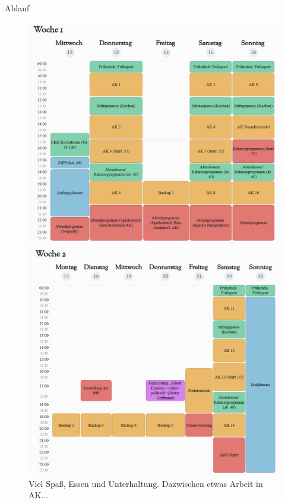 \documentclass[compress,]{beamer}
\begin{document}
\begin{frame}{Ablauf}


\begin{figure}
   \begin{minipage}[b]{.45\linewidth} %
      \includegraphics[width=\linewidth]{OstseePlan1.png}
      
   \end{minipage}
   \hspace{.05\linewidth}%
   \begin{minipage}[b]{.45\linewidth} %
      \includegraphics[width=\linewidth]{OstseePlan2.png}
      
   \end{minipage}
   \caption{Viel Spaß, Essen und Unterhaltung. Dazwischen etwas Arbeit in AK...}
\end{figure}

\end{frame}
\end{document}
